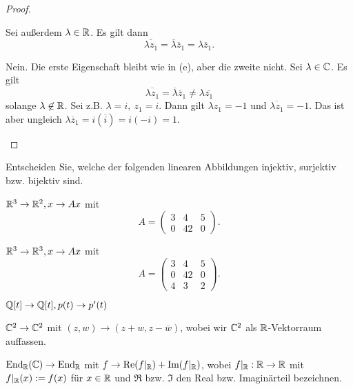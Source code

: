 \begin{proof}
\begin{parts}
		Sei außerdem $\lambda\in \mathbb{R}$. Es gilt dann
		\[
		\overline{\lambda z_1}=\overline{\lambda}\overline{z}_1=\lambda \overline{z}_1
		.\] 
	\item Nein. Die erste Eigenschaft bleibt wie in (e), aber die zweite nicht. Sei $\lambda\in \mathbb{C}$. Es gilt
		\[
		\overline{\lambda z_1}=\overline{\lambda}\overline{z}_1\neq \lambda \overline{z_1}
	\]
	solange $\lambda \not\in \mathbb{R}$. Sei z.B. $\lambda=i,~z_1=i$. Dann gilt $\lambda z_1=-1$ und $\overline{\lambda z_1}=-1$. Das ist aber ungleich $\lambda \overline{z}_1=i(\overline{i})=i(-i)=1$.\qedhere
	\end{parts}
\end{proof}

\begin{Problem}
Entscheiden Sie, welche der folgenden linearen Abbildungen injektiv, surjektiv bzw. bijektiv sind.
\begin{parts}
\item $\mathbb{R}^3\to \mathbb{R}^2,x\to Ax$ mit
	\[
		A=\begin{pmatrix} 3 & 4 & 5\\0 & 42 & 0 \end{pmatrix} 
	.\] 
\item $\mathbb{R}^3\to \mathbb{R}^3,x\to Ax$ mit
	\[
		A=\begin{pmatrix} 3 & 4 & 5 \\ 0 & 42 & 0 \\ 4 & 3 & 2 \end{pmatrix} 
	.\] 
\item $\mathbb{Q}[t]\to \mathbb{Q}[t],p(t)\to p'(t)$
\item $\mathbb{C}^2\to \mathbb{C}^2$ mit $(z,w)\to (z+w,z-\overline{w})$, wobei wir $\mathbb{C}^2$ als $\mathbb{R}$-Vektorraum auffassen.
\item $\text{End}_{\mathbb{R}}(\mathbb{C})\to\text{End}_{\mathbb{R}}$ mit $f\to \text{Re}(f|_{\mathbb{R}})+\text{Im}(f|_{\mathbb{R}})$, wobei $f|_{\mathbb{R}}:\mathbb{R}\to \mathbb{R}$ mit $f|_{\mathbb{R}}(x):=f(x)$ f\"{u}r $x\in \mathbb{R}$ und $\Re$ bzw. $\Im$ den Real bzw. Imaginärteil bezeichnen.
\end{parts}
\end{Problem}
